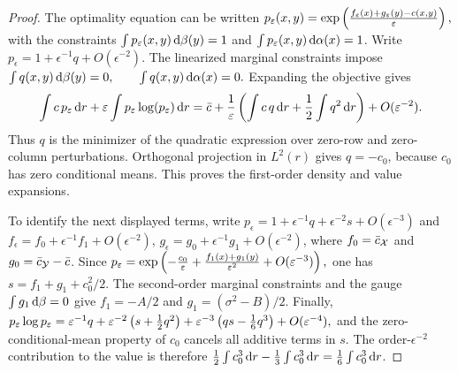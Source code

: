 \begin{proof}
The optimality equation can be written
\(p_\varepsilon(x,y)=\exp\left( \frac{f_\varepsilon(x)+g_\varepsilon(y)-c(x,y)}{\varepsilon} \right),\)
with the constraints $\int p_\varepsilon(x,y)\,\mathrm{d}\beta(y)=1$ and $\int p_\varepsilon(x,y)\,\mathrm{d}\alpha(x)=1$. Write $p_\epsilon=1+\epsilon^{-1}q+O(\epsilon^{-2})$. The linearized marginal constraints impose
\(\int q(x,y)\,\mathrm{d}\beta(y)=0, \qquad \int q(x,y)\,\mathrm{d}\alpha(x)=0.\)
Expanding the objective gives
\[
\int c\,p_\varepsilon\,\mathrm{d} r+\varepsilon\int p_\varepsilon\log(p_\varepsilon)\,\mathrm{d} r
=
\bar c+\frac1{\varepsilon}
\left( \int c\,q\,\mathrm{d} r+\frac12\int q^2\,\mathrm{d} r \right)
+O(\varepsilon^{-2}).
\]
Thus $q$ is the minimizer of the quadratic expression over zero-row and zero-column perturbations. Orthogonal projection in $L^2(r)$ gives $q=-c_0$, because $c_0$ has zero conditional means. This proves the first-order density and value expansions.

To identify the next displayed terms, write $p_\epsilon=1+\epsilon^{-1}q+\epsilon^{-2}s+O(\epsilon^{-3})$ and
$f_\epsilon=f_0+\epsilon^{-1}f_1+O(\epsilon^{-2})$, $g_\epsilon=g_0+\epsilon^{-1}g_1+O(\epsilon^{-2})$, where $f_0=\bar c_{\mathcal{X}}$ and $g_0=\bar c_{\mathcal{Y}}-\bar c$. Since
\(p_\varepsilon = \exp\left( -\frac{c_0}{\varepsilon}+\frac{f_1(x)+g_1(y)}{\varepsilon^2}+O(\varepsilon^{-3}) \right),\)
one has $s=f_1+g_1+c_0^2/2$. The second-order marginal constraints and the gauge $\int g_1\,\mathrm{d}\beta=0$ give $f_1=-A/2$ and $g_1=(\sigma^2-B)/2$. Finally,
\(p_\varepsilon\log p_\varepsilon = \varepsilon^{-1}q+\varepsilon^{-2}\left( s+\frac12 q^2 \right) +\varepsilon^{-3}\left( q s-\frac16 q^3 \right)+O(\varepsilon^{-4}),\)
and the zero-conditional-mean property of $c_0$ cancels all additive terms in $s$. The order-$\epsilon^{-2}$ contribution to the value is therefore
$\frac12\int c_0^3\,\mathrm{d} r-\frac13\int c_0^3\,\mathrm{d} r=\frac16\int c_0^3\,\mathrm{d} r$.
\end{proof}
